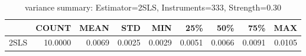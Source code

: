 \begin{table}[ht]
\centering
\caption{variance summary: Estimator=2SLS, Instruments=333, Strength=0.30}
\begin{tabular}{lrrrrrrrr}
\toprule
 & COUNT & MEAN & STD & MIN & 25\% & 50\% & 75\% & MAX \\
\midrule
2SLS & 10.0000 & 0.0069 & 0.0025 & 0.0029 & 0.0051 & 0.0066 & 0.0091 & 0.0105 \\
\bottomrule
\end{tabular}
\end{table}

